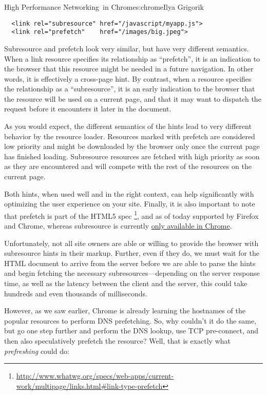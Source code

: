 \begin{aosachapter}{High Performance Networking~in Chrome}{s:chrome}{Ilya Grigorik}
\begin{verbatim}
  <link rel="subresource" href="/javascript/myapp.js">
  <link rel="prefetch"    href="/images/big.jpeg">
\end{verbatim}

Subresource and prefetch look very similar, but have very different
semantics. When a link resource specifies its relationship as
``prefetch'', it is an indication to the browser that this resource
might be needed in a future navigation. In other words, it is
effectively a cross-page hint. By contrast, when a resource specifies
the relationship as a ``subresource'', it is an early indication to the
browser that the resource will be used on a current page, and that it
may want to dispatch the request before it encounters it later in the
document.

As you would expect, the different semantics of the hints lead to very
different behavior by the resource loader. Resources marked with
prefetch are considered low priority and might be downloaded by the
browser only once the current page has finished loading. Subresource
resources are fetched with high priority as soon as they are encountered
and will compete with the rest of the resources on the current page.

Both hints, when used well and in the right context, can help
significantly with optimizing the user experience on your site. Finally,
it is also important to note that prefetch is part of the HTML5 spec
\footnote{\url{http://www.whatwg.org/specs/web-apps/current-work/multipage/links.html#link-type-prefetch}},
and as of today supported by Firefox and Chrome, whereas subresource is
currently
\href{http://www.chromium.org/spdy/link-headers-and-server-hint/link-rel-subresource}{only
available in Chrome}.


Unfortunately, not all site owners are able or willing to provide the
browser with subresource hints in their markup. Further, even if they
do, we must wait for the HTML document to arrive from the server before
we are able to parse the hints and begin fetching the necessary
subresources---depending on the server response time, as well as the
latency between the client and the server, this could take hundreds and
even thousands of milliseconds.

However, as we saw earlier, Chrome is already learning the hostnames of
the popular resources to perform DNS prefetching. So, why couldn't it do
the same, but go one step further and perform the DNS lookup, use TCP
pre-connect, and then also speculatively prefetch the resource? Well,
that is exactly what \emph{prefreshing} could do:


\end{aosachapter}
